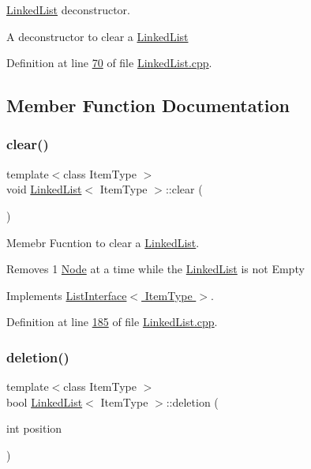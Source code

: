 \hyperlink{classLinkedList}{Linked\+List} deconstructor. 

A deconstructor to clear a \hyperlink{classLinkedList}{Linked\+List} 

Definition at line \hyperlink{LinkedList_8cpp_source_l00070}{70} of file \hyperlink{LinkedList_8cpp_source}{Linked\+List.\+cpp}.



\subsection{Member Function Documentation}
\mbox{\label{classLinkedList_a7d1d9cf83eef67b6c4d700a3cc5970e1}} 
\subsubsection{\texorpdfstring{clear()}{clear()}}
{\footnotesize\ttfamily template$<$class Item\+Type $>$ \\
void \hyperlink{classLinkedList}{Linked\+List}$<$ Item\+Type $>$\+::clear (\begin{DoxyParamCaption}{ }\end{DoxyParamCaption})\hspace{0.3cm}{\ttfamily [virtual]}}



Memebr Fucntion to clear a \hyperlink{classLinkedList}{Linked\+List}. 

Removes 1 \hyperlink{classNode}{Node} at a time while the \hyperlink{classLinkedList}{Linked\+List} is not Empty 

Implements \hyperlink{classListInterface_adfda414908b645bdf19bcab8269168b7}{List\+Interface$<$ Item\+Type $>$}.



Definition at line \hyperlink{LinkedList_8cpp_source_l00185}{185} of file \hyperlink{LinkedList_8cpp_source}{Linked\+List.\+cpp}.

\mbox{\label{classLinkedList_a7dc3cca217b45c6fe5d28c9d16b7bf9e}} 
\subsubsection{\texorpdfstring{deletion()}{deletion()}}
{\footnotesize\ttfamily template$<$class Item\+Type $>$ \\
bool \hyperlink{classLinkedList}{Linked\+List}$<$ Item\+Type $>$\+::deletion (\begin{DoxyParamCaption}\item[{int}]{position }\end{DoxyParamCaption})\hspace{0.3cm}{\ttfamily [virtual]}}



